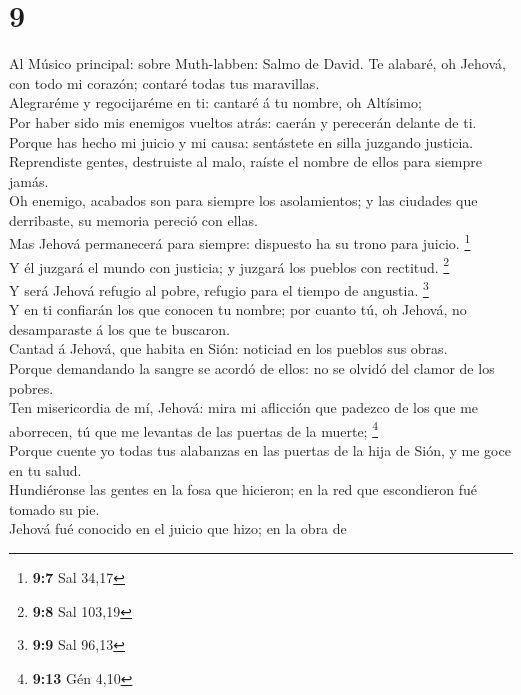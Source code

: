 \hypertarget{section-8}{%
\section{9}\label{section-8}}

 Al Músico principal: sobre Muth-labben: Salmo de David. Te
alabaré, oh Jehová, con todo mi corazón; contaré todas tus maravillas.\\
 Alegraréme y regocijaréme en ti: cantaré á tu nombre, oh
Altísimo;\\
 Por haber sido mis enemigos vueltos atrás: caerán y
perecerán delante de ti.\\
 Porque has hecho mi juicio y mi causa: sentástete en silla
juzgando justicia.\\
 Reprendiste gentes, destruiste al malo, raíste el nombre de
ellos para siempre jamás.\\
 Oh enemigo, acabados son para siempre los asolamientos; y
las ciudades que derribaste, su memoria pereció con ellas.\\
 Mas Jehová permanecerá para siempre: dispuesto ha su trono
para juicio. \footnote{\textbf{9:7} Sal 34,17}\\
 Y él juzgará el mundo con justicia; y juzgará los pueblos
con rectitud. \footnote{\textbf{9:8} Sal 103,19}\\
 Y será Jehová refugio al pobre, refugio para el tiempo de
angustia. \footnote{\textbf{9:9} Sal 96,13}\\
 Y en ti confiarán los que conocen tu nombre; por cuanto
tú, oh Jehová, no desamparaste á los que te buscaron.\\
 Cantad á Jehová, que habita en Sión: noticiad en los
pueblos sus obras.\\
 Porque demandando la sangre se acordó de ellos: no se
olvidó del clamor de los pobres.\\
 Ten misericordia de mí, Jehová: mira mi aflicción que
padezco de los que me aborrecen, tú que me levantas de las puertas de la
muerte; \footnote{\textbf{9:13} Gén 4,10}\\
 Porque cuente yo todas tus alabanzas en las puertas de la
hija de Sión, y me goce en tu salud.\\
 Hundiéronse las gentes en la fosa que hicieron; en la red
que escondieron fué tomado su pie.\\
 Jehová fué conocido en el juicio que hizo; en la obra de

